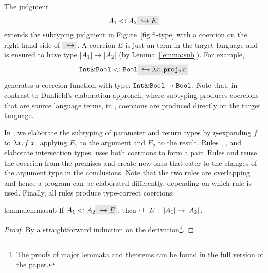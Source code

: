 The judgment
\[
A_1 \subtype A_2 \yields E
\]
extends the subtyping judgment in Figure~\ref{fig:fi-type} with a coercion
on the right hand side of $ \yields {} $. A coercion $ E $ is just an term
in the target language and is ensured to have type
$ \im {A_1} \to \im {A_2} $ (by Lemma~\ref{lemma:sub}). For example,
\[
\code{Int} \inter \code{Bool} \subtype \code{Bool} \yields {\lamty x {\im {\code{Int} \inter \code{Bool}}} {\proj 2 x}}
\]
generates a coercion function with type: $\code{Int} \inter \code{Bool} \to \code{Bool}$.
Note that, in contrast to Dunfield's elaboration approach, where subtyping produces
coercions that are source language terms, in \name, coercions are
produced directly on the target language.

In , we elaborate the subtyping of
parameter and return types by $\eta$-expanding $f$ to $\lamty x {\im {A_3}}
{\app f x}$, applying $E_1$ to the argument and $E_2$ to the result. Rules
, , and
 elaborate intersection types.
 uses both coercions to form a pair. Rules
 and  reuse the coercion
from the premises and create new ones that cater to the changes of the argument
type in the conclusions. Note that the two rules are overlapping and
hence a program can be elaborated differently, depending on which rule
is used. Finally, all rules produce type-correct coercions:



\begin{restatable}{lemma}{lemmasub}
  \label{lemma:sub}
  If $ A_1 \subtype A_2 \yields E $, then $ \jtype \cdot E {\im {A_1} \to \im {A_2}} $.
\end{restatable}

\begin{proof}
  By a straightforward induction on the derivation\footnote{The proofs of major lemmata and theorems can be found in the full version of the paper.}.
\end{proof}

